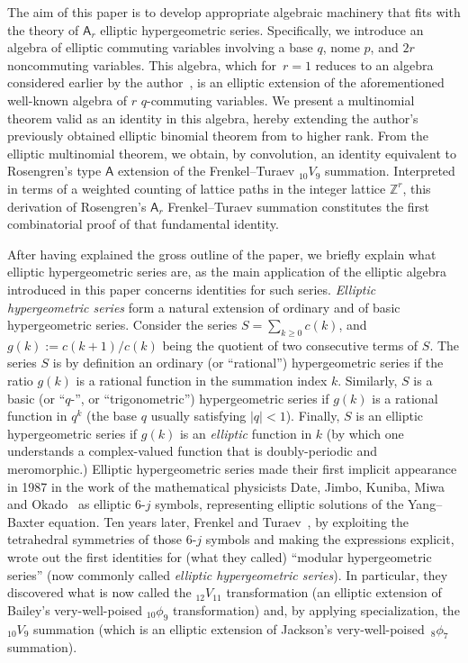 \documentclass[pdftex]{sigma}
\numberwithin{equation}{section}
\theoremstyle{definition}
\begin{document}
The aim of this paper is to develop appropriate algebraic machinery
that fits with the theory of $\mathsf A_r$ elliptic hypergeometric series.
Specifically, we introduce an algebra of elliptic commuting variables
involving a base $q$, nome $p$, and $2r$ noncommuting
variables. This algebra, which for~${r=1}$
reduces to an algebra considered earlier by the author~\cite{S1},
is an elliptic extension of the aforementioned well-known
algebra of $r$ $q$-commuting variables. We present
a multinomial theorem valid as an identity in this algebra,
hereby extending the author's previously obtained elliptic
binomial theorem from \cite{S1} to higher rank.
From the elliptic multinomial theorem, we obtain, by convolution,
an identity equivalent to Rosengren's type $\mathsf A$ extension
of the Frenkel--Turaev ${}_{10}V_9$ summation.
Interpreted in terms of a weighted counting of lattice paths
in the integer lattice $\mathbb Z^r$, this derivation of Rosengren's
$\mathsf A_r$ Frenkel--Turaev summation constitutes
the first combinatorial proof of that fundamental identity.

After having explained the gross outline of the paper, we
briefly explain what elliptic hypergeometric series are,
as the main application of the elliptic algebra introduced
in this paper concerns identities for such series.
\textit{Elliptic hypergeometric series} form a
natural extension of
ordinary and of basic hypergeometric series.
Consider the series
$S=\sum_{k\ge 0}c(k)$, and~${g(k):=c(k+1)/c(k)}$
being the quotient of two consecutive terms of $S$.
The series $S$ is by definition an ordinary (or ``rational'')
hypergeometric series if the ratio $g(k)$ is a rational
function in the summation index $k$. Similarly, $S$ is a
basic (or ``$q$-'', or ``trigonometric'') hypergeometric
series if $g(k)$ is a rational function in $q^k$ (the base
$q$ usually satisfying $|q|<1$). Finally, $S$ is an elliptic
hypergeometric series if $g(k)$ is an \textit{elliptic}
function in $k$ (by which one understands a
complex-valued function that is doubly-periodic and
meromorphic.) Elliptic hypergeometric series made
their first implicit appearance in 1987 in the work of
the mathematical physicists Date, Jimbo, Kuniba, Miwa
and Okado~\cite{DJKMO} as elliptic $6$-$j$ symbols,
representing elliptic solutions of the Yang--Baxter equation.
Ten years later, Frenkel and Turaev~\cite{FT}, by exploiting the
tetrahedral symmetries of those $6$-$j$ symbols and making the
expressions explicit, wrote out the first identities for (what they called)
``modular hypergeometric series'' (now commonly called
\textit{elliptic hypergeometric series}). In particular, they discovered
what is now called the ${}_{12}V_{11}$
transformation (an elliptic extension of Bailey's very-well-poised
${}_{10}\phi_9$ transformation) and, by applying specialization,
the ${}_{10}V_9$ summation (which is an elliptic extension of
Jackson's very-well-poised~${}_8\phi_7$ summation).
\end{document}
